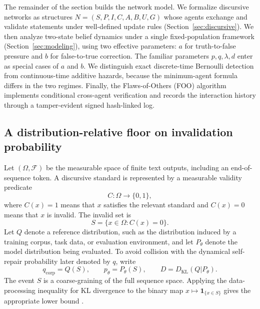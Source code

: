 \documentclass[12pt]{article}
\theoremstyle{definition}
\begin{document}
The remainder of the section builds the network model.  We formalize discursive
networks as structures $N=(S,P,I,C,A,B,U,G)$ whose agents exchange and validate
statements under well-defined update rules (Section~\ref{sec:discursive}).  We
then analyze two-state belief dynamics under a single fixed-population framework
(Section~\ref{sec:modeling}), using two effective parameters: $a$ for
truth-to-false pressure and $b$ for false-to-true correction.  The familiar
parameters $p,q,\lambda,d$ enter as special cases of $a$ and $b$.  We distinguish
exact discrete-time Bernoulli detection from continuous-time additive hazards,
because the minimum-agent formula differs in the two regimes.  Finally, the
Flaws-of-Others (FOO) algorithm implements conditional cross-agent verification
and records the interaction history through a tamper-evident signed hash-linked
log.


\subsection{A distribution-relative floor on invalidation probability}
\label{sec:invalidation-floor}

Let $(\Omega,\mathcal F)$ be the measurable space of finite text outputs,
including an end-of-sequence token.  A discursive standard is represented by a
measurable validity predicate
\[
    C:\Omega\to\{0,1\},
\]
where $C(x)=1$ means that $x$ satisfies the relevant standard and $C(x)=0$ means
that $x$ is invalid.  The invalid set is
\[
    S=\{x\in\Omega:C(x)=0\}.
\]
Let $Q$ denote a reference distribution, such as the distribution induced by a
training corpus, task data, or evaluation environment, and let $P_\theta$ denote
the model distribution being evaluated.  To avoid collision with the dynamical
self-repair probability later denoted by $q$, write
\[
    q_{\mathrm{corp}}=Q(S),\qquad
    p_\theta=P_\theta(S),\qquad
    D=D_{\mathrm{KL}}(Q|P_\theta).
\]
The event $S$ is a coarse-graining of the full sequence space.  Applying the
data-processing inequality for KL divergence to the binary map
$x\mapsto\mathbf 1_{\{x\in S\}}$ gives the appropriate lower bound
\parencite{cover2006elements}.
\end{document}
